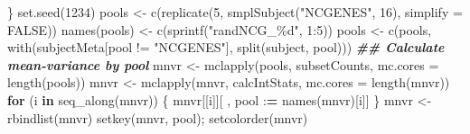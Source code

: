 \documentclass[11pt,letterpaper,oneside]{book}
\newenvironment{Shaded}{\begin{snugshade}}{\end{snugshade}}
\newcommand{\AttributeTok}[1]{\textcolor[rgb]{0.77,0.63,0.00}{#1}}
\newcommand{\ConstantTok}[1]{\textcolor[rgb]{0.00,0.00,0.00}{#1}}
\newcommand{\ControlFlowTok}[1]{\textcolor[rgb]{0.13,0.29,0.53}{\textbf{#1}}}
\newcommand{\DecValTok}[1]{\textcolor[rgb]{0.00,0.00,0.81}{#1}}
\newcommand{\DocumentationTok}[1]{\textcolor[rgb]{0.56,0.35,0.01}{\textbf{\textit{#1}}}}
\newcommand{\ErrorTok}[1]{\textcolor[rgb]{0.64,0.00,0.00}{\textbf{#1}}}
\newcommand{\FunctionTok}[1]{\textcolor[rgb]{0.00,0.00,0.00}{#1}}
\newcommand{\NormalTok}[1]{#1}
\newcommand{\OtherTok}[1]{\textcolor[rgb]{0.56,0.35,0.01}{#1}}
\newcommand{\SpecialCharTok}[1]{\textcolor[rgb]{0.00,0.00,0.00}{#1}}
\newcommand{\StringTok}[1]{\textcolor[rgb]{0.31,0.60,0.02}{#1}}
\begin{document}
\begin{Shaded}
\begin{Highlighting}[]
\NormalTok{\}}
\FunctionTok{set.seed}\NormalTok{(}\DecValTok{1234}\NormalTok{)}
\NormalTok{pools }\OtherTok{\textless{}{-}} \FunctionTok{c}\NormalTok{(}\FunctionTok{replicate}\NormalTok{(}\DecValTok{5}\NormalTok{, }\FunctionTok{smplSubject}\NormalTok{(}\StringTok{"NCGENES"}\NormalTok{, }\DecValTok{16}\NormalTok{), }\AttributeTok{simplify =} \ConstantTok{FALSE}\NormalTok{))}
\FunctionTok{names}\NormalTok{(pools) }\OtherTok{\textless{}{-}} \FunctionTok{c}\NormalTok{(}\FunctionTok{sprintf}\NormalTok{(}\StringTok{"randNCG\_\%d"}\NormalTok{, }\DecValTok{1}\SpecialCharTok{:}\DecValTok{5}\NormalTok{))}
\NormalTok{pools }\OtherTok{\textless{}{-}} \FunctionTok{c}\NormalTok{(pools,}
           \FunctionTok{with}\NormalTok{(subjectMeta[pool }\SpecialCharTok{!=} \StringTok{"NCGENES"}\NormalTok{], }\FunctionTok{split}\NormalTok{(subject, pool)))}
\DocumentationTok{\#\# Calculate mean{-}variance by pool}
\NormalTok{mnvr }\OtherTok{\textless{}{-}} \FunctionTok{mclapply}\NormalTok{(pools, subsetCounts, }\AttributeTok{mc.cores =} \FunctionTok{length}\NormalTok{(pools))}
\NormalTok{mnvr }\OtherTok{\textless{}{-}} \FunctionTok{mclapply}\NormalTok{(mnvr, calcIntStats, }\AttributeTok{mc.cores =} \FunctionTok{length}\NormalTok{(mnvr))}
\ControlFlowTok{for}\NormalTok{ (i }\ControlFlowTok{in} \FunctionTok{seq\_along}\NormalTok{(mnvr)) \{}
\NormalTok{  mnvr[[i]][ , pool }\SpecialCharTok{:}\ErrorTok{=} \FunctionTok{names}\NormalTok{(mnvr)[i]]}
\NormalTok{\}}
\NormalTok{mnvr }\OtherTok{\textless{}{-}} \FunctionTok{rbindlist}\NormalTok{(mnvr)}
\FunctionTok{setkey}\NormalTok{(mnvr, pool); }\FunctionTok{setcolorder}\NormalTok{(mnvr)}


\end{Highlighting}
\end{Shaded}
\end{document}
